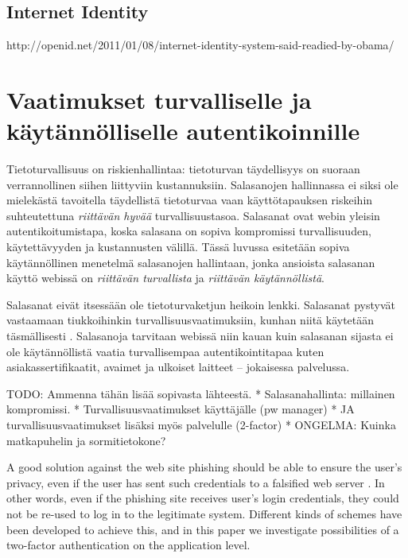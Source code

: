 \documentclass[english,gradu]{tktltiki}
\begin{document}


\subsection{Internet Identity} %
\label{sub:internet_identity}

http://openid.net/2011/01/08/internet-identity-system-said-readied-by-obama/



\section{Vaatimukset turvalliselle ja käytännölliselle autentikoinnille} %
\label{sec:autentikoituminen_turvallisesti_ja_käytännöllisesti}

Tietoturvallisuus on riskienhallintaa: tietoturvan täydellisyys on suoraan verrannollinen siihen liittyviin kustannuksiin. Salasanojen hallinnassa ei siksi ole mielekästä tavoitella täydellistä tietoturvaa vaan käyttötapauksen riskeihin suhteutettuna \emph{riittävän hyvää} turvallisuustasoa. Salasanat ovat webin yleisin autentikoitumistapa, koska salasana on sopiva kompromissi turvallisuuden, käytettävyyden ja kustannusten välillä. Tässä luvussa esitetään sopiva käytännöllinen menetelmä salasanojen hallintaan, jonka ansioista salasanan käyttö webissä on \emph{riittävän turvallista} ja \emph{riittävän käytännöllistä}.

Salasanat eivät itsessään ole tietoturvaketjun heikoin lenkki. Salasanat pystyvät vastaamaan tiukkoihinkin turvallisuusvaatimuksiin, kunhan niitä käytetään täsmällisesti \cite{will_we_ever_escape_passwords_05}. Salasanoja tarvitaan webissä niin kauan kuin salasanan sijasta ei ole käytännöllistä vaatia turvallisempaa autentikointitapaa kuten asiakassertifikaatit, avaimet ja ulkoiset laitteet -- jokaisessa palvelussa.


TODO: Ammenna tähän lisää sopivasta lähteestä.
* Salasanahallinta: millainen kompromissi.
* Turvallisuusvaatimukset käyttäjälle (pw manager)
* JA turvallisuusvaatimukset lisäksi myös palvelulle (2-factor)
* ONGELMA: Kuinka matkapuhelin ja sormitietokone?

A good solution against the web site phishing should be able to ensure the user's privacy, even if the user has sent such credentials to a falsified web server \cite{phishing_attacks_and_solutions_2007}. In other words, even if the phishing site receives user's login credentials, they could not be re-used to log in to the legitimate system. Different kinds of schemes have been developed to achieve this, and in this paper we investigate possibilities of a two-factor authentication \cite{NIST_SP800-63, schneier_2factor_2005, google_2step_2010} on the application level.
\end{document}
